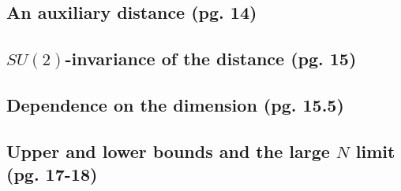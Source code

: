 \documentclass{article}
\begin{document}
\subsection{An auxiliary distance (pg. 14)}

\subsection{$SU(2)$-invariance of the distance (pg. 15)}

\subsection{Dependence on the dimension (pg. 15.5)}

\subsection{Upper and lower bounds and the large $N$ limit (pg. 17-18)}
\end{document}
